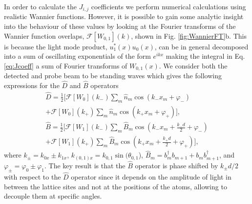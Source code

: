 In order to calculate the $J_{i,j}$ coefficients we perform numerical
calculations using realistic Wannier functions. However, it is
possible to gain some analytic insight into the behaviour of these
values by looking at the Fourier transforms of the Wannier function
overlaps, $\mathcal{F}[W_{0,1}](k)$, shown in Fig.
\ref{fig:WannierFT}b. This is because the light mode product,
$u_1^*(x) u_0(x)$, can be in general decomposed into a sum of
oscillating exponentials of the form $e^{i k x}$ making the integral
in Eq. \eqref{eq:Jcoeff} a sum of Fourier transforms of
$W_{0,1}(x)$. We consider both the detected and probe beam to be
standing waves which gives the following expressions for the $\hat{D}$
and $\hat{B}$ operators
\begin{eqnarray}
  \label{eq:FTs}
  \hat{D} =
  \frac{1}{2}[\mathcal{F}[W_0](k_-)\sum_m\hat{n}_m\cos(k_- x_m
    +\varphi_-)
    \nonumber\\ +\mathcal{F}[W_0](k_+)\sum_m\hat{n}_m\cos(k_+
    x_m +\varphi_+)], \nonumber\\ \hat{B} =
  \frac{1}{2}[\mathcal{F}[W_1](k_-)\sum_m\hat{B}_m\cos(k_- x_m
    +\frac{k_-d}{2}+\varphi_-)
    \nonumber\\ +\mathcal{F}[W_1](k_+)\sum_m\hat{B}_m\cos(k_+
    x_m +\frac{k_+d}{2}+\varphi_+)],
\end{eqnarray}
where $k_\pm = k_{0x} \pm k_{1x}$, $k_{(0,1)x} = k_{0,1}
\sin(\theta_{0,1}$), $\hat{B}_m=b^\dag_mb_{m+1}+b_mb^\dag_{m+1}$, and
$\varphi_\pm=\varphi_0 \pm \varphi_1$. The key result is that the
$\hat{B}$ operator is phase shifted by $k_\pm d/2$ with respect to the
$\hat{D}$ operator since it depends on the amplitude of light in
between the lattice sites and not at the positions of the atoms,
allowing to decouple them at specific angles.

